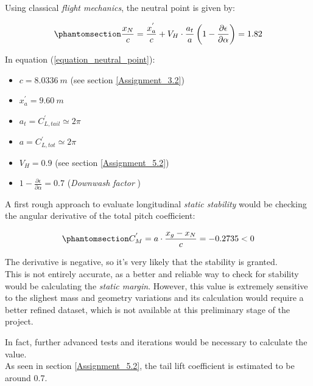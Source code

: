 \documentclass{article}
\begin{document}
Using classical \textit{flight mechanics}, the neutral point is given by:

\begin{equation}
    \phantomsection
    \label{equation_neutral_point}
    \frac{x_N}{c} = \frac{x^{'}_{a}}{c} + V_H \cdot \frac{a_t}{a}\left(1-\frac{\partial \epsilon}{\partial \alpha}\right) = 1.82 
\end{equation}

In equation (\ref{equation_neutral_point}):

\begin{itemize}
    \item $c = 8.0336 \ m$ (see section \ref{Assignment_3.2})
    \item $x^{'}_{a} = 9.60 \ m$ 
    \item $a_t = C^{'}_{L,tail} \simeq 2\pi$
    \item $a = C^{'}_{L,tot} \simeq 2\pi$
    \item $V_H = 0.9 $ (see section \ref{Assignment_5.2})
    \item $1-\frac{\partial \epsilon}{\partial \alpha} = 0.7$ (\textit{Downwash factor} \autocite{Sadraey_Mohammad})
\end{itemize}

\clearpage

A first rough approach to evaluate longitudinal \textit{static stability} would be checking 
the angular derivative of the total pitch coefficient:

\begin{equation}
    \phantomsection
    \label{equation_stability}
    C^{'}_{M} = a \cdot \frac{x_g - x_N}{c} = -0.2735 < 0
\end{equation}

The derivative is negative, so it's very likely that the stability is granted. \\ 

This is not entirely accurate, as a better and reliable way to check for stability would be 
calculating the \textit{static margin}. 
However, this value is extremely sensitive to the slighest mass and
geometry variations and its calculation would require a better
refined dataset, which is not available at this preliminary stage of the project. 

In fact, further advanced tests and iterations would be necessary to calculate the value. \\ 

As seen in section \ref{Assignment_5.2}, the tail lift coefficient is estimated to be around 0.7.
\end{document}
